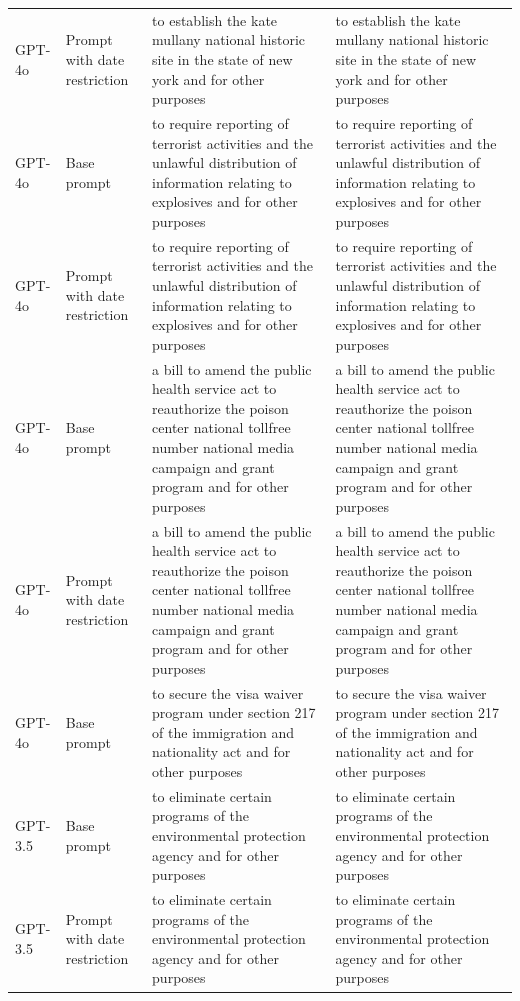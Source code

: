 \begin{longtable}{>{\raggedright\arraybackslash}p{1.4cm}>{\raggedright\arraybackslash}p{1.4cm}>{\raggedright\arraybackslash}p{5.5cm}>{\raggedright\arraybackslash}p{5.5cm}}
GPT-4o & Prompt with date restriction & to establish the kate mullany national historic site in the state of new york and for other purposes & to establish the kate mullany national historic site in the state of new york and for other purposes\\
GPT-4o & Base prompt & to require reporting of terrorist activities and the unlawful distribution of information relating to explosives and for other purposes & to require reporting of terrorist activities and the unlawful distribution of information relating to explosives and for other purposes\\
GPT-4o & Prompt with date restriction & to require reporting of terrorist activities and the unlawful distribution of information relating to explosives and for other purposes & to require reporting of terrorist activities and the unlawful distribution of information relating to explosives and for other purposes\\
GPT-4o & Base prompt & a bill to amend the public health service act to reauthorize the poison center national tollfree number national media campaign and grant program and for other purposes & a bill to amend the public health service act to reauthorize the poison center national tollfree number national media campaign and grant program and for other purposes\\
GPT-4o & Prompt with date restriction & a bill to amend the public health service act to reauthorize the poison center national tollfree number national media campaign and grant program and for other purposes & a bill to amend the public health service act to reauthorize the poison center national tollfree number national media campaign and grant program and for other purposes\\
GPT-4o & Base prompt & to secure the visa waiver program under section 217 of the immigration and nationality act and for other purposes & to secure the visa waiver program under section 217 of the immigration and nationality act and for other purposes\\
GPT-3.5 & Base prompt & to eliminate certain programs of the environmental protection agency and for other purposes & to eliminate certain programs of the environmental protection agency and for other purposes\\
GPT-3.5 & Prompt with date restriction & to eliminate certain programs of the environmental protection agency and for other purposes & to eliminate certain programs of the environmental protection agency and for other purposes\\

\end{longtable}
